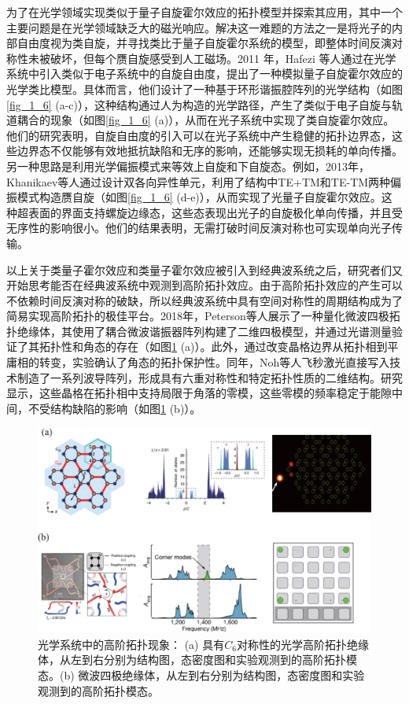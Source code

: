 为了在光学领域实现类似于量子自旋霍尔效应的拓扑模型并探索其应用，其中一个主要问题是在光学领域缺乏大的磁光响应。解决这一难题的方法之一是将光子的内部自由度视为类自旋，并寻找类比于量子自旋霍尔系统的模型，即整体时间反演对称性未被破坏，但每个赝自旋感受到人工磁场。2011 年，Hafezi 等人通过在光学系统中引入类似于电子系统中的自旋自由度，提出了一种模拟量子自旋霍尔效应的光学类比模型\cite{g3,g6}。具体而言，他们设计了一种基于环形谐振腔阵列的光学结构（如图\ref{fig_1_6} (a-c)），这种结构通过人为构造的光学路径，产生了类似于电子自旋与轨道耦合的现象（如图\ref{fig_1_6} (a)），从而在光子系统中实现了类自旋霍尔效应。他们的研究表明，自旋自由度的引入可以在光子系统中产生稳健的拓扑边界态，这些边界态不仅能够有效地抵抗缺陷和无序的影响，还能够实现无损耗的单向传播。另一种思路是利用光学偏振模式来等效上自旋和下自旋态。例如，2013年，Khanikaev等人通过设计双各向异性单元，利用了结构中TE+TM和TE-TM两种偏振模式构造赝自旋（如图\ref{fig_1_6} (d-e)），从而实现了光量子自旋霍尔效应\cite{g-add-1}。这种超表面的界面支持螺旋边缘态，这些态表现出光子的自旋极化单向传播，并且受无序性的影响很小。他们的结果表明，无需打破时间反演对称也可实现单向光子传输。

以上关于类量子霍尔效应和类量子霍尔效应被引入到经典波系统之后，研究者们又开始思考能否在经典波系统中观测到高阶拓扑效应。由于高阶拓扑效应的产生可以不依赖时间反演对称的破缺，所以经典波系统中具有空间对称性的周期结构成为了简易实现高阶拓扑的极佳平台。2018年，Peterson等人展示了一种量化微波四极拓扑绝缘体\cite{h5}，其使用了耦合微波谐振器阵列构建了二维四极模型，并通过光谱测量验证了其拓扑性和角态的存在（如图\ref{fig_1_7} (a)）。此外，通过改变晶格边界从拓扑相到平庸相的转变，实验确认了角态的拓扑保护性。同年，Noh等人飞秒激光直接写入技术制造了一系列波导阵列，形成具有六重对称性和特定拓扑性质的二维结构\cite{h6}。研究显示，这些晶格在拓扑相中支持局限于角落的零模，这些零模的频率稳定于能隙中间，不受结构缺陷的影响（如图\ref{fig_1_7} (b)）。

\begin{figure}[h!]
    \centering
    \includegraphics[width=1\textwidth]{images/fig1-7.eps} 
    \caption{光学系统中的高阶拓扑现象：
    (a) 具有$C_6$对称性的光学高阶拓扑绝缘体\cite{h5}，从左到右分别为结构图，态密度图和实验观测到的高阶拓扑模态。(b) 微波四极绝缘体\cite{h6}，从左到右分别为结构图，态密度图和实验观测到的高阶拓扑模态。
    }
    \label{fig_1_7}
\end{figure}

